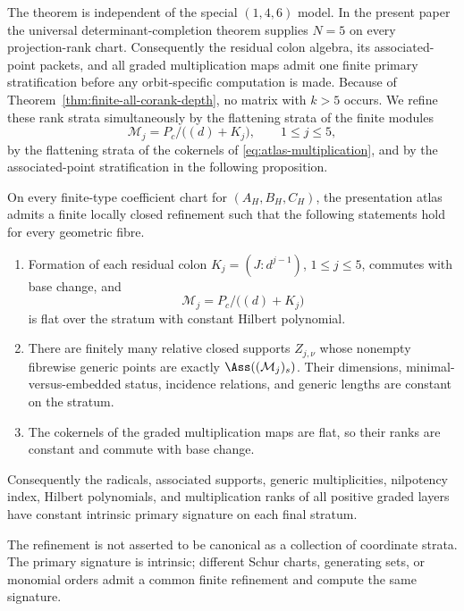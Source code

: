 

The theorem is independent of the special \((1,4,6)\) model.  In the
present paper the universal determinant-completion theorem supplies
\(N=5\) on every projection-rank chart.  Consequently the residual
colon algebra, its associated-point packets, and all graded
multiplication maps admit one finite primary stratification before
any orbit-specific computation is made.
Because of Theorem~\ref{thm:finite-all-corank-depth}, no matrix with
\(k>5\) occurs.  We refine these rank strata simultaneously by the
flattening strata of the finite modules
\[
 \mathcal M_j=P_c/\bigl((d)+K_j\bigr),\qquad 1\le j\le5,
\]
by the flattening strata of the cokernels of
\eqref{eq:atlas-multiplication}, and by the associated-point
stratification in the following proposition.

\begin{proposition}
\label{prop:associated-prime-refinement}
On every finite-type coefficient chart for
\((A_H,B_H,C_H)\), the presentation atlas admits a finite locally
closed refinement such that the following statements hold for every
geometric fibre.
\begin{enumerate}
\item Formation of each residual colon
\(K_j=(J:d^{j-1})\), \(1\le j\le5\), commutes with base change,
and
\[
 \mathcal M_j=P_c/\bigl((d)+K_j\bigr)
\]
is flat over the stratum with constant Hilbert polynomial.
\item There are finitely many relative closed supports
\(Z_{j,\nu}\) whose nonempty fibrewise generic points are exactly
\(\Ass((\mathcal M_j)_s)\).  Their dimensions,
minimal-versus-embedded status, incidence relations, and generic
lengths are constant on the stratum.
\item The cokernels of the graded multiplication maps are flat, so
their ranks are constant and commute with base change.
\end{enumerate}
Consequently the radicals, associated supports, generic
multiplicities, nilpotency index, Hilbert polynomials, and
multiplication ranks of all positive graded layers have constant
intrinsic primary signature on each final stratum.

The refinement is not asserted to be canonical as a collection of
coordinate strata.  The primary signature is intrinsic; different
Schur charts, generating sets, or monomial orders admit a common
finite refinement and compute the same signature.
\end{proposition}

